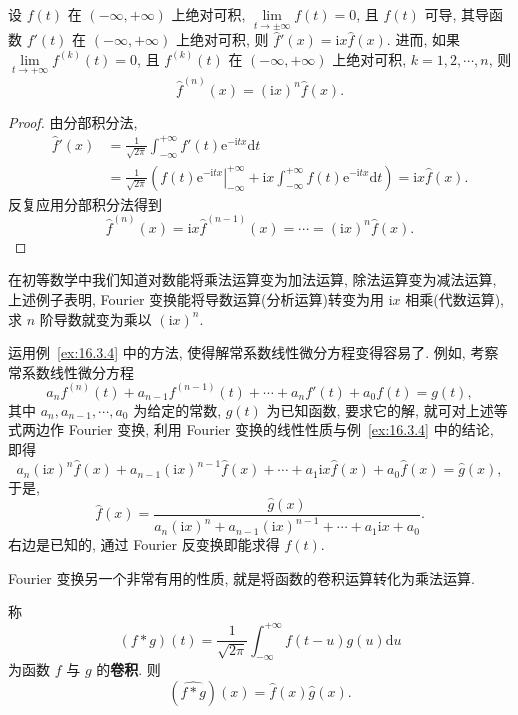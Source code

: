 \begin{example}\label{ex:16.3.4}
设 $f(t)$ 在 $(-\infty,+\infty)$ 上绝对可积, $\lim\limits_{t\to\pm\infty}f(t)=0$, 且 $f(t)$ 可导, 其导函数 $f'(t)$ 在 $(-\infty,+\infty)$ 上绝对可积, 则 $\hat{f}'(x)=\mathrm{i}x\hat{f}(x)$. 进而, 如果 $\lim\limits_{t\to+\infty}f^{(k)}(t)=0$, 且 $f^{(k)}(t)$ 在 $(-\infty,+\infty)$ 上绝对可积, $k=1,2,\cdots,n$, 则
\[
  \hat{f}^{(n)}(x)=\left(\mathrm{i}x\right)^{n}\hat{f}(x).
\]
\end{example}

\begin{proof}
由分部积分法,
\begin{align*}
  \hat{f}'(x)&=\frac{1}{\sqrt{2\pi}}\int_{-\infty}^{+\infty}f'(t)\mathrm{e}^{-\mathrm{i}tx}\mathrm{d}t\\
  &=\frac{1}{\sqrt{2\pi}}\left(\left.f(t)\mathrm{e}^{-\mathrm{i}tx}\right|_{-\infty}^{+\infty}+\mathrm{i}x\int_{-\infty}^{+\infty}f(t)\mathrm{e}^{-\mathrm{i}tx}\mathrm{d}t\right)=\mathrm{i}x\hat{f}(x).
\end{align*}
反复应用分部积分法得到
\[
  \hat{f}^{(n)}(x)=\mathrm{i}x\hat{f}^{(n-1)}(x)=\cdots=(\mathrm{i}x)^{n}\hat{f}(x).
\]
\end{proof}

在初等数学中我们知道对数能将乘法运算变为加法运算, 除法运算变为减法运算, 上述例子表明, Fourier 变换能将导数运算(分析运算)转变为用 $\mathrm{i}x$ 相乘(代数运算), 求 $n$ 阶导数就变为乘以 $(\mathrm{i}x)^{n}$.

\begin{example}\label{ex:16.3.5}
运用例~\ref{ex:16.3.4} 中的方法, 使得解常系数线性微分方程变得容易了. 例如, 考察常系数线性微分方程
\[
  a_{n}f^{(n)}(t)+a_{n-1}f^{(n-1)}(t)+\cdots+a_{n}f'(t)+a_{0}f(t)=g(t), %
\]
其中 $a_{n},a_{n-1},\cdots,a_{0}$ 为给定的常数, $g(t)$ 为已知函数, 要求它的解, 就可对上述等式两边作 Fourier 变换, 利用 Fourier 变换的线性性质与例~\ref{ex:16.3.4} 中的结论, 即得
\[
  a_{n}(\mathrm{i}x)^{n}\hat{f}(x)+a_{n-1}(\mathrm{i}x)^{n-1}\hat{f}(x)+\cdots+a_{1}\mathrm{i}x\hat{f}(x)+a_{0}\hat{f}(x)=\hat{g}(x),
\]
于是,
\[
  \hat{f}(x)=\frac{\hat{g}(x)}{a_{n}(\mathrm{i}x)^{n}+a_{n-1}(\mathrm{i}x)^{n-1}+\cdots+a_{1}\mathrm{i}x+a_{0}}.
\]
右边是已知的, 通过 Fourier 反变换即能求得 $f(t)$.
\end{example}

Fourier 变换另一个非常有用的性质, 就是将函数的卷积运算转化为乘法运算.

\begin{example}\label{ex:16.3.6}
称
\[
  (f*g)(t)=\frac{1}{\sqrt{2\pi}}\int_{-\infty}^{+\infty}f(t-u)g(u)\mathrm{d}u
\]
为函数 $f$ 与 $g$ 的\textbf{卷积}. 则
\[
  (\widehat{f*g})(x)=\hat{f}(x)\hat{g}(x).
\]
\end{example}

